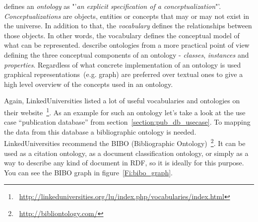{\citet{jour:gruber} defines an \textit{ontology} as "'\textit{an explicit specification of a conceptualization}"'.
\textit{Conceptualizations} are objects, entities or concepts that may or may not exist in the universe. In addition to that, the \textit{vocabulary} defines the relationships between those objects. In other words, the vocabulary defines the conceptual model of what can be represented. 
\citet{jour:owl} describe ontologies from a more practical point of view defining the three conceptual components of an ontology - \textit{classes}, \textit{instances} and \textit{properties}. Regardless of what concrete implementation of an ontology is used graphical representations~(e.g. graph) are preferred over textual ones to give a high level overview of the concepts used in an ontology. 

Again, LinkedUniversities listed a lot of useful vocabularies and ontologies on their website~\footnote{~\url{http://linkeduniversities.org/lu/index.php/vocabularies/index.html}}. As an example for such an ontology let's take a look at the use case "`publication database"' from section~\ref{section:pub_db_usecase}. To mapping the data from this database a bibliographic ontology is needed. LinkedUniversities recommend the BIBO (Bibliographic Ontology)~\footnote{~\url{http://bibliontology.com/}}. It can be used as a citation ontology, as a document classification ontology, or simply as a way to describe any kind of document in RDF, so it is ideally for this purpose. You can see the BIBO graph in figure~\ref{Fi:bibo_graph}.

}

